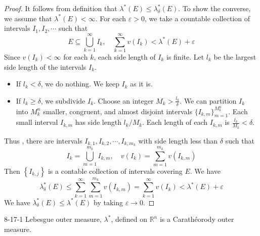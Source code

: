 \documentclass[../main.tex]{subfiles}
\begin{document}
\begin{proof}
    It follows from definition that \(   \lambda ^{*}\left( E \right)\le  \lambda _{ \delta }^{*}\left( E \right)    \).
    To show the converse, we assume that \(   \lambda ^{*}\left( E \right)< \infty   \). For each \(   \varepsilon > 0  \), we take a countable collection of intervals \(  I_1,I_2,\cdots   \) such that \[
    E\subseteq \bigcup _{k= 1}^{\infty}I_{k},\quad \sum _{k= 1}^{\infty}v\left(I_{k} \right)<  \lambda ^{*}\left( E \right)+  \varepsilon  
    \]   Since \(  v\left( I_{k} \right)< \infty   \) for each \(  k  \), each side length of \(  I_{k}  \) is finite. Let $l_k$ be the largest side length of the intervals $I_k$. 
    \begin{itemize}
        \item If $l_k < \delta$, we do nothing. We keep $I_k$ as it is.
        \item If $l_k \ge \delta$, we subdivide $I_k$. Choose an integer $M_k > \frac{l_k }{\delta}$. We can partition $I_k$ into $M_k^n$ smaller, congruent, and almost disjoint intervals $\{I_{k,m}\}_{m=1}^{M_k^n}$. Each small interval $I_{k,m}$ has side length $l_k/M_k$. Each length of each $I_{k,m}$ is $\frac{l_k}{M_k} < \delta$.
    \end{itemize}
   Thus , there are intervals \(  I_{k,1}, I_{k,2},\cdots ,I_{k,m_{k}}  \) with side length less than \(   \delta   \)  such that  \[
    I_{k}= \bigcup _{m = 1}^{m_{k}}I_{k,m},\quad v\left( I_{k} \right)= \sum _{m= 1}^{m_{k}}v\left( I_{k,m} \right)  
    \]   Then \(  \left\{ I_{k, j} \right\} \) is a contable collection of intervals covering \(  E  \). We have \[
     \lambda _{ \delta }^{*}\left( E \right)\le \sum _{k= 1}^{\infty}\sum _{m= 1}^{m_{k}} v\left( I_{k,m} \right)= \sum _{k= 1}^{\infty}v\left( I_{k} \right)<  \lambda ^{*}\left( E \right)+  \varepsilon    
    \]We have \(   \lambda _{ \delta }^{*}\left( E \right)\le  \lambda ^{*}\left( E \right)    \) by taking \(   \varepsilon \to 0  \).  
\end{proof}

\begin{theorem}{}{8-17-1}
    Lebesgue outer measure, \(   \lambda ^{*}  \), defined on \(  \mathbb{R} ^{n}  \) is a Carath\'eorody outer measure.  
\end{theorem}
\end{document}
